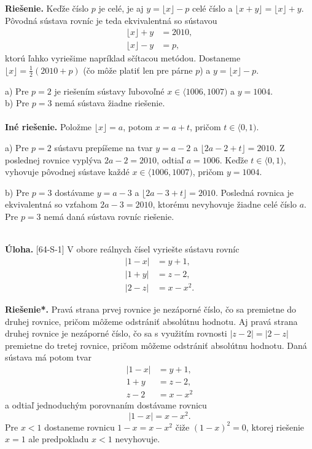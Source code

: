 \documentclass[11pt,a4paper,oneside,final]{book}
\newcommand{\ul}{\textbf{Úloha.} }
\newcommand{\rie}{\textbf{Riešenie.} }
\newcommand{\rieh}{\textbf{Riešenie*.} }
\begin{document}
\rie Keďže číslo $p$ je celé, je aj $y = \lfloor x \rfloor-p$ celé číslo a $\lfloor x+y \rfloor = \lfloor x\rfloor+y$. Pôvodná sústava rovníc je teda ekvivalentná so sústavou
\begin{align*}
\lfloor x \rfloor + y &= 2 010,\\
\lfloor x\rfloor - y &= p,
\end{align*}
ktorú ľahko vyriešime napríklad sčítacou metódou. Dostaneme $\lfloor x \rfloor = \frac{1}{2}(2 010 + p)$ (čo môže platiť len pre párne $p$) a $y = \lfloor x \rfloor - p$.

a) Pre $p = 2$ je riešením sústavy ľubovoľné $x \in \langle 1006, 1007)$ a $y = 1 004$.\\

b) Pre $p = 3$ nemá sústava žiadne riešenie.
\\
\\
\textbf{Iné riešenie.} Položme $\lfloor x \rfloor = a$, potom $x = a + t$, pričom $t \in \langle 0, 1)$.

a) Pre $p = 2$ sústavu prepíšeme na tvar $y = a-2$ a $\lfloor 2a-2+t \rfloor = 2 010$. Z poslednej
rovnice vyplýva $2a - 2 = 2 010$, odtiaľ  $a = 1 006$. Keďže $t \in \langle 0, 1)$, vyhovuje pôvodnej sústave každé $x \in \langle 1006, 1007)$, pričom $y = 1 004$.

b) Pre $p = 3$ dostávame $y = a - 3$ a $\lfloor 2a - 3 + t\rfloor = 2 010$. Posledná rovnica je ekvivalentná so vzťahom $2a - 3 = 2 010$, ktorému nevyhovuje žiadne celé číslo $a$. Pre $p = 3$ nemá daná sústava rovníc riešenie.\\
\\
\begin{tcolorbox}[breakable,notitle,boxrule=0pt,colback=light-gray,colframe=light-gray]\ul [64-S-1]
V obore reálnych čísel vyriešte sústavu rovníc
\begin{align*}
|1 - x| &= y + 1,\\
|1 + y| &= z - 2,\\
|2 - z| &= x - x^2.
\end{align*}
\end{tcolorbox}

\rieh  Pravá strana prvej rovnice je nezáporné číslo, čo sa premietne do druhej rovnice, pričom môžeme odstrániť absolútnu hodnotu. Aj pravá strana druhej rovnice je nezáporné číslo, čo sa s využitím rovnosti $|z -2| = |2-z|$ premietne do tretej rovnice, pričom môžeme odstrániť absolútnu hodnotu. Daná sústava má potom tvar
\begin{align*}
|1 - x| &= y + 1,\\
1 + y &= z - 2,\\
z - 2 &= x - x^2
\end{align*}
a odtiaľ jednoduchým porovnaním dostávame rovnicu
$$|1 - x| = x - x^2.$$
Pre $x < 1$ dostaneme rovnicu $1-x = x-x^2$ čiže $(1-x)^2 = 0$, ktorej riešenie $x = 1$ ale predpokladu $x < 1$ nevyhovuje.
\end{document}
